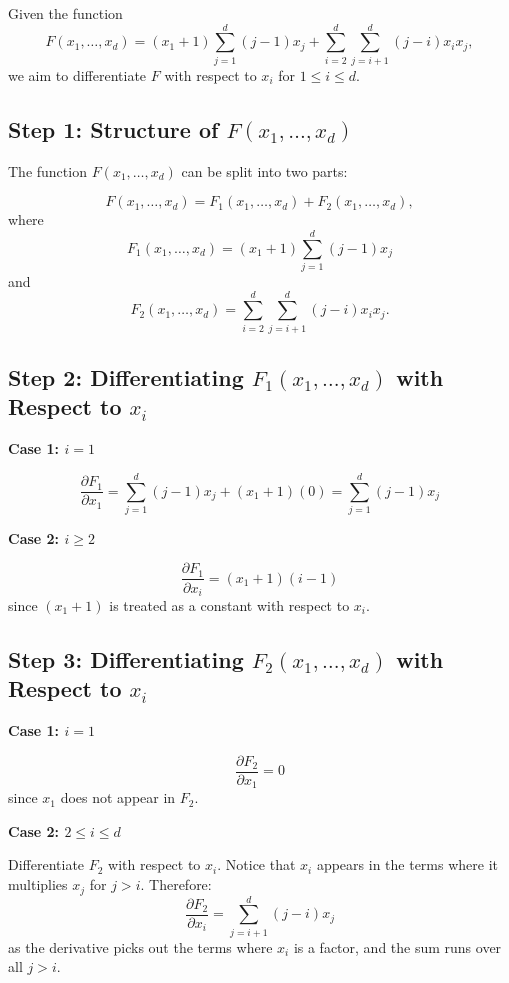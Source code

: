 \documentclass[11pt]{article}
\begin{document}
Given the function
\[
F(x_1, \dots, x_d) = (x_1 + 1)\sum\limits_{j=1}^{d} (j - 1) x_j + \sum\limits_{i = 2}^d \sum\limits_{j=i+1}^d (j - i) x_i x_j,
\]
we aim to differentiate \( F \) with respect to \( x_i \) for \( 1 \leq i \leq d \).

\subsection*{Step 1: Structure of \( F(x_1, \dots, x_d) \)}

The function \( F(x_1, \dots, x_d) \) can be split into two parts:

\[
F(x_1, \dots, x_d) = F_1(x_1, \dots, x_d) + F_2(x_1, \dots, x_d),
\]
where
\[
F_1(x_1, \dots, x_d) = (x_1 + 1) \sum\limits_{j=1}^{d} (j - 1) x_j
\]
and
\[
F_2(x_1, \dots, x_d) = \sum\limits_{i = 2}^d \sum\limits_{j=i+1}^d (j - i) x_i x_j.
\]

\subsection*{Step 2: Differentiating \( F_1(x_1, \dots, x_d) \) with Respect to \( x_i \)}

\textbf{Case 1: \( i = 1 \)}

\[
\frac{\partial F_1}{\partial x_1} = \sum\limits_{j=1}^{d} (j - 1) x_j + (x_1 + 1)(0) = \sum\limits_{j=1}^{d} (j - 1) x_j
\]

\textbf{Case 2: \( i \geq 2 \)}

\[
\frac{\partial F_1}{\partial x_i} = (x_1 + 1)(i - 1)
\]
since \( (x_1 + 1) \) is treated as a constant with respect to \( x_i \).

\subsection*{Step 3: Differentiating \( F_2(x_1, \dots, x_d) \) with Respect to \( x_i \)}

\textbf{Case 1: \( i = 1 \)}

\[
\frac{\partial F_2}{\partial x_1} = 0
\]
since \( x_1 \) does not appear in \( F_2 \).

\textbf{Case 2: \( 2 \leq i \leq d \)}

Differentiate \( F_2 \) with respect to \( x_i \). Notice that \( x_i \) appears in the terms where it multiplies \( x_j \) for \( j > i \). Therefore:
\[
\frac{\partial F_2}{\partial x_i} = \sum\limits_{j=i+1}^d (j - i) x_j
\]
as the derivative picks out the terms where \( x_i \) is a factor, and the sum runs over all \( j > i \).
\end{document}
